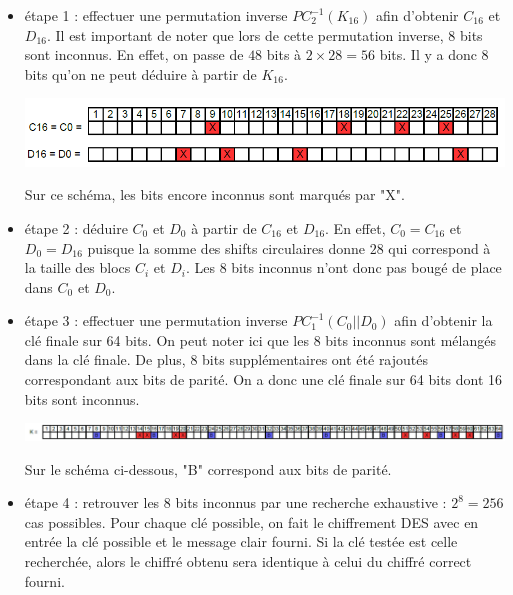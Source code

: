 \documentclass[11pt]{article}
\begin{document}
\begin{itemize}
	\item étape 1 : effectuer une permutation inverse $PC_{2}^{-1}(K_{16})$ afin d'obtenir $C_{16}$ et $D_{16}$.
	Il est important de noter que lors de cette permutation inverse, 8 bits sont inconnus. En effet, on passe de $48$ bits à $2 \times 28 = 56$ bits. Il y a donc 8 bits qu'on ne peut déduire à partir de $K_{16}$. \newline
	
	\begin{center}\includegraphics[scale=0.4]{../pictures/C0_D0.png}\end{center}
	
	Sur ce schéma, les bits encore inconnus sont marqués par "X". \newline
	
	
	\item étape 2 : déduire $C_{0}$ et $D_{0}$ à partir de $C_{16}$ et $D_{16}$. En effet, $C_{0}=C_{16}$ et $D_{0}=D_{16}$ puisque la somme des shifts circulaires donne $28$ qui correspond à la taille des blocs $C_i$ et $D_i$. Les 8 bits inconnus n'ont donc pas bougé de place dans $C_0$ et $D_0$. \newline
	
	\item étape 3 : effectuer une permutation inverse $PC_{1}^{-1}(C_{0}||D_{0})$ afin d'obtenir la clé finale sur 64 bits. On peut noter ici que les 8 bits inconnus sont mélangés dans la clé finale. De plus, 8 bits supplémentaires ont été rajoutés correspondant aux bits de parité. On a donc une clé finale sur 64 bits dont 16 bits sont inconnus. \newline
	
	\begin{center}\includegraphics[scale=0.5]{../pictures/K64.png}\end{center}
	
	Sur le schéma ci-dessous, "B" correspond aux bits de parité. \newline
	
	\item étape 4 : retrouver les 8 bits inconnus par une recherche exhaustive : $2^{8}=256$ cas possibles. Pour chaque clé possible, on fait le chiffrement DES avec en entrée la clé possible et le message clair fourni. Si la clé testée est celle recherchée, alors le chiffré obtenu sera identique à celui du chiffré correct fourni. \newline
	

\end{itemize}
\end{document}
